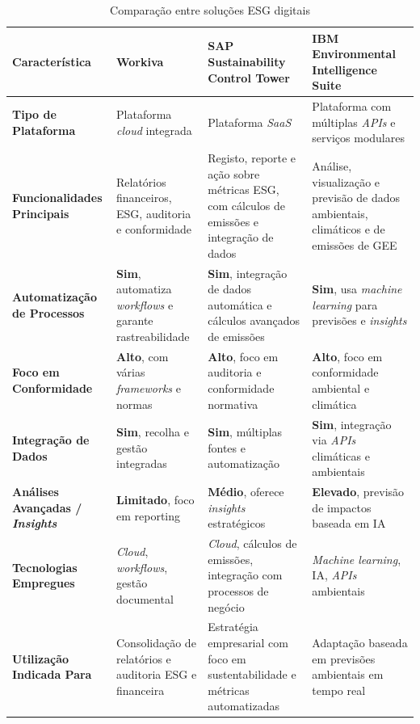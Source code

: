 \begin{table}[H]
\centering
\begin{tabular}{|p{2.6cm}|p{3.3cm}|p{4cm}|p{4cm}|}
\hline
\textbf{Característica} & \textbf{Workiva} & \textbf{SAP Sustainability Control Tower} & \textbf{IBM Environmental Intelligence Suite} \\
\hline
\textbf{Tipo de Plataforma} & Plataforma \textit{cloud} integrada & Plataforma \textit{\gls{SaaS}} & Plataforma com múltiplas \textit{APIs} e serviços modulares \\
\hline
\textbf{Funcionalidades Principais} & Relatórios financeiros, \gls{ESG}, auditoria e conformidade & Registo, reporte e ação sobre métricas \gls{ESG}, com cálculos de emissões e integração de dados & Análise, visualização e previsão de dados ambientais, climáticos e de emissões de \gls{GEE} \\
\hline
\textbf{Automatização de Processos} & \textbf{Sim}, automatiza \textit{workflows} e garante rastreabilidade & \textbf{Sim}, integração de dados automática e cálculos avançados de emissões & \textbf{Sim}, usa \textit{machine learning} para previsões e \textit{insights} \\
\hline
\textbf{Foco em Conformidade} & \textbf{Alto}, com várias \textit{frameworks} e normas & \textbf{Alto}, foco em auditoria e conformidade normativa & \textbf{Alto}, foco em conformidade ambiental e climática \\
\hline
\textbf{Integração de Dados} & \textbf{Sim}, recolha e gestão integradas & \textbf{Sim}, múltiplas fontes e automatização & \textbf{Sim}, integração via \textit{APIs} climáticas e ambientais \\
\hline
\textbf{Análises Avançadas / \textit{Insights}} & \textbf{Limitado}, foco em reporting & \textbf{Médio}, oferece \textit{insights} estratégicos & \textbf{Elevado}, previsão de impactos baseada em \gls{IA} \\
\hline
\textbf{Tecnologias Empregues} & \textit{Cloud}, \textit{workflows}, gestão documental & \textit{Cloud}, cálculos de emissões, integração com processos de negócio & \textit{Machine learning}, \gls{IA}, \textit{APIs} ambientais \\
\hline
\textbf{Utilização Indicada Para} & Consolidação de relatórios e auditoria \gls{ESG} e financeira & Estratégia empresarial com foco em sustentabilidade e métricas automatizadas & Adaptação baseada em previsões ambientais em tempo real \\
\hline
\end{tabular}
\caption{Comparação entre soluções ESG digitais}
\label{tab:comparacao_solucoes_esg}
\end{table}


